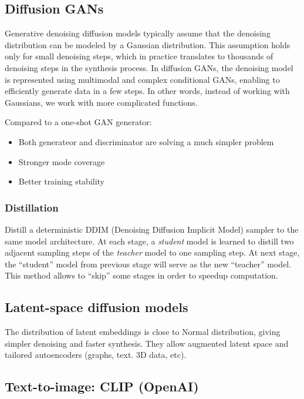 \documentclass{article}
\begin{document}
\subsection{Diffusion GANs}\label{diffusion-gans}

Generative denoising diffusion models typically assume that the
denoising distribution can be modeled by a Gaussian distribution. This
assumption holds only for small denoising steps, which in practice
translates to thousands of denoising steps in the synthesis process. In
diffusion GANs, the denoising model is represented using multimodal and
complex conditional GANs, enabling to efficiently generate data in a few
steps. In other words, instead of working with Gaussians, we work with
more complicated functions.

Compared to a one-shot GAN generator:

\begin{itemize}
\tightlist
\item
  Both generateor and discriminator are solving a much simpler problem
\item
  Stronger mode coverage
\item
  Better training stability
\end{itemize}

\subsubsection{Distillation}\label{distillation}

Distill a deterministic DDIM (Denoising Diffusion Implicit Model)
sampler to the same model architecture. At each stage, a \emph{student}
model is learned to distill two adjacent sampling steps of the
\emph{teacher} model to one sampling step. At next stage, the
``student'' model from previous stage will serve as the new ``teacher''
model. This method allows to ``skip'' some stages in order to speedup
computation.

\subsection{Latent-space diffusion
models}\label{latent-space-diffusion-models}

The distribution of latent embeddings is close to Normal distribution,
giving simpler denoising and faster synthesis. They allow augmented
latent space and tailored autoencoders (graphs, text. 3D data, etc).

\subsection{Text-to-image: CLIP
(OpenAI)}\label{text-to-image-clip-openai}
\end{document}
